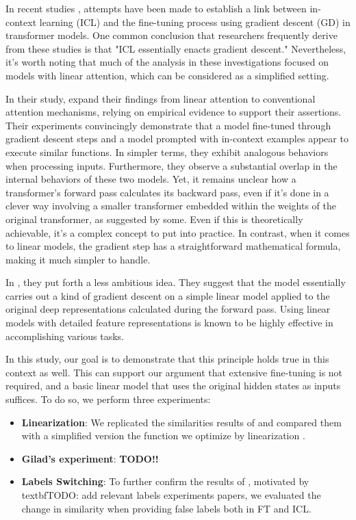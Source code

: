 In recent studies \cite{pmlr-v202-von-oswald23a,dai2023gpt}, attempts have been made to establish a link between in-context learning (ICL) and the fine-tuning process using gradient descent (GD) in transformer models. One common conclusion that researchers frequently derive from these studies is that "ICL essentially enacts gradient descent." Nevertheless, it's worth noting that much of the analysis in these investigations focused on models with linear attention, which can be considered as a simplified setting.

In their study, \cite{dai2023gpt} expand their findings from linear attention to conventional attention mechanisms, relying on empirical evidence to support their assertions.
Their experiments convincingly demonstrate that a model fine-tuned through gradient descent steps and a model prompted with in-context examples appear to execute similar functions. In simpler terms, they exhibit analogous behaviors when processing inputs. Furthermore, they observe a substantial overlap in the internal behaviors of these two models.
Yet, it remains unclear how a transformer's forward pass calculates its backward pass, even if it's done in a clever way involving a smaller transformer embedded within the weights of the original transformer, as suggested by some. Even if this is theoretically achievable, it's a complex concept to put into practice. In contrast, when it comes to linear models, the gradient step has a straightforward mathematical formula, making it much simpler to handle.

In \cite{pmlr-v202-von-oswald23a}, they put forth a less ambitious idea. They suggest that the model essentially carries out a kind of gradient descent on a simple linear model applied to the original deep representations calculated during the forward pass.
Using linear models with detailed feature representations is known to be highly effective in accomplishing various tasks.


In this study, our goal is to demonstrate that this principle holds true in this context as well. This can support our argument that extensive fine-tuning is not required, and a basic linear model that uses the original hidden states as inputs suffices.
To do so, we perform three experiments:
\begin{itemize}
    \item \textbf{Linearization}: We replicated the similarities results of \cite{dai2023gpt} and compared them with a simplified version the function we optimize by linearization \cite{linearization23}.
    \item \textbf{Gilad's experiment}: \textbf{TODO!!}
    \item \textbf{Labels Switching}: To further confirm the results of \cite{dai2023gpt}, motivated by textbf{TODO: add relevant labels experiments papers}, we evaluated the change in similarity when providing false labels both in FT and ICL.
\end{itemize}

